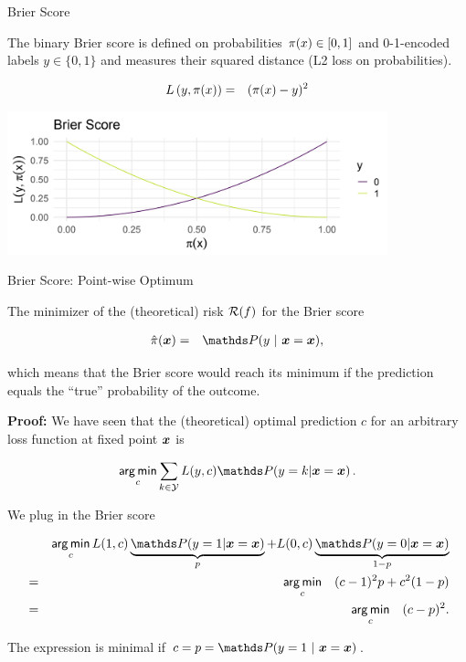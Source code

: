 \begin{vbframe}{Brier Score}

The binary Brier score is defined on probabilities $\pi(x) \in [0, 1]$ and 0-1-encoded labels $y \in \{0, 1\}$ and measures their squared distance (L2 loss on probabilities).

\begin{eqnarray*}
L\left(y, \pi(x)\right) &=& (\pi(x) - y)^2
\end{eqnarray*}

\vspace{0.2cm}
\begin{center}
\includegraphics[width = 11cm ]{figure_man/Brier-score.png} \\
\end{center}


\end{vbframe}

\begin{vbframe}{Brier Score: Point-wise Optimum}

The minimizer of the (theoretical) risk $\mathcal{R}(f)$ for the Brier score  

\begin{eqnarray*}
\hat \pi(\xv) &=& \P(y~|~\xv = \xv),
\end{eqnarray*}

which means that the Brier score would reach its minimum if the prediction equals the \enquote{true} probability of the outcome. 

\lz 

\textbf{Proof: }We have seen that the (theoretical) optimal prediction $c$ for an arbitrary loss function at fixed point $\bm{x}$ is

$$
\argmin_{c} \sum_{k \in \Yspace} L(y, c) \P(y = k| \xv = \xv)\,.
$$

We plug in the Brier score

\vspace*{-0.3cm}

\begin{footnotesize}
  \begin{eqnarray*}
    && \argmin_c L(1, c) \underbrace{\P(y = 1| \xv = \xv)}_p + L(0, c) \underbrace{\P(y = 0| \xv = \xv)}_{1 - p} \\ 
    &=&  \argmin_c \quad (c - 1)^2 p + c^2 (1 - p)\\
    &=&  \argmin_c \quad (c - p)^2.
  \end{eqnarray*}
\end{footnotesize}

The expression is minimal if $c = p = \P(y = 1~|~\xv = \xv)$.

\end{vbframe}

